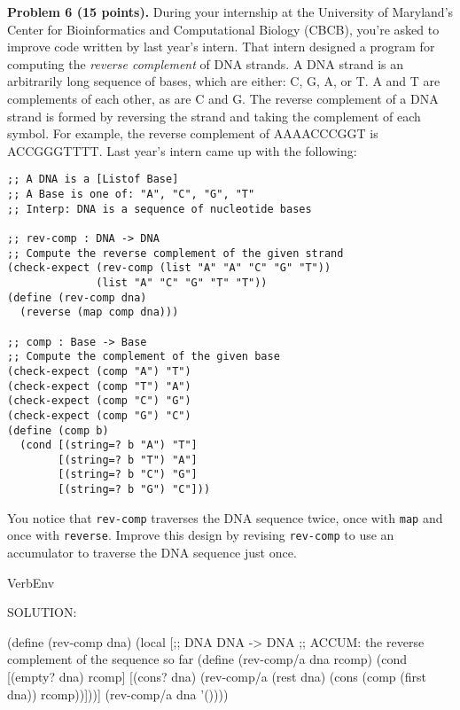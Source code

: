 \documentclass[12pt]{article}
\begin{document}



\newpage
\noindent
{\bf Problem 6 (15 points).}  
%
During your internship at the University of Maryland's Center for
Bioinformatics and Computational Biology (CBCB), you're asked to
improve code written by last year's intern.  That intern designed a
program for computing the \emph{reverse complement} of DNA strands.
%
A DNA strand is an arbitrarily long sequence of bases, which are
either: C, G, A, or T.  A and T are complements of each other, as are
C and G.  The reverse complement of a DNA strand is formed by
reversing the strand and taking the complement of each symbol.  For
example, the reverse complement of AAAACCCGGT is ACCGGGTTTT.
%
Last year's intern came up with the following:
\begin{verbatim}
;; A DNA is a [Listof Base]
;; A Base is one of: "A", "C", "G", "T"
;; Interp: DNA is a sequence of nucleotide bases

;; rev-comp : DNA -> DNA
;; Compute the reverse complement of the given strand
(check-expect (rev-comp (list "A" "A" "C" "G" "T"))
              (list "A" "C" "G" "T" "T"))
(define (rev-comp dna)
  (reverse (map comp dna)))

;; comp : Base -> Base
;; Compute the complement of the given base
(check-expect (comp "A") "T")
(check-expect (comp "T") "A")
(check-expect (comp "C") "G")
(check-expect (comp "G") "C")
(define (comp b)
  (cond [(string=? b "A") "T"]
        [(string=? b "T") "A"]
        [(string=? b "C") "G"]
        [(string=? b "G") "C"]))
\end{verbatim}
You notice that {\tt rev-comp} traverses the DNA sequence twice, once
with {\tt map} and once with {\tt reverse}.  Improve this design by
revising {\tt rev-comp} to use an accumulator to traverse the DNA
sequence just once.

\newpage


\begin{SaveVerbatim}{VerbEnv}


SOLUTION:

(define (rev-comp dna)
  (local [;; DNA DNA -> DNA
          ;; ACCUM: the reverse complement of the sequence so far
          (define (rev-comp/a dna rcomp)
            (cond [(empty? dna) rcomp]
                  [(cons? dna)
                   (rev-comp/a (rest dna)
                               (cons (comp (first dna)) rcomp))]))]
     (rev-comp/a dna '())))                      
\end{SaveVerbatim}
\end{document}
